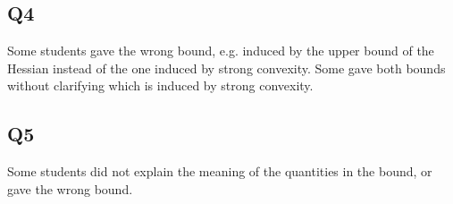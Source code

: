 \subsection*{Q4}
Some students gave the wrong bound, e.g. induced by the upper bound of the Hessian instead of the one induced by strong convexity. Some gave both bounds without clarifying which is induced by strong convexity. 

\subsection*{Q5}
Some students did not explain the meaning of the quantities in the bound, or gave the wrong bound.
